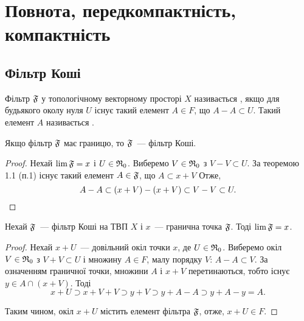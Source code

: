\chapter{Повнота, передкомпактність, компактність}

\section{Фільтр Коші}

\begin{definition}
    Фільтр $\frak F$ у топологічному векторному просторі $X$ називається , якщо для будьякого околу нуля $U$ існує такий елемент $A \in F$, що $A - A \subset U$. Такий елемент $A$ називається .
\end{definition}

\begin{theorem}
    Якщо фільтр $\frak F$ має границю, то $\frak F$~--- фільтр Коші.
\end{theorem}

\begin{proof}
    Нехай $\lim \frak F = x$ і $U \in \frak R_0$. Виберемо $V \in \frak R_0$ з $V - V \subset U$. За теоремою 1.1 (п.1) існує такий елемент $A \in \frak F$, що $A \subset x + V$ Отже,
    \begin{equation*}
        A - A \subset(x + V) -(x + V) \subset V - V \subset U. \qedhere
    \end{equation*}
\end{proof}

\begin{theorem}
    Нехай $\frak F$~--- фільтр Коші на ТВП $X$ і $x$~--- гранична точка $\frak F$. Тоді $\lim \frak F = x$.
\end{theorem}

\begin{proof}
    Нехай $x + U$~--- довільний окіл точки $x$, де $U \in \frak R_0$. Виберемо окіл $V \in \frak R_0$ з $V + V \subset U$ і множину $A \in F$, малу порядку $V$: $A - A \subset V$. За означенням граничної точки, множини $A$ і $x + V$ перетинаються, тобто існує $y \in A \cap(x + V)$. Тоді
    \begin{equation*}
        x + U \supset x + V + V \supset y + V \supset y + A - A \supset y + A - y = A.
    \end{equation*}

    Таким чином, окіл $x + U$ містить елемент фільтра $\frak F$, отже, $x + U \in F$.
\end{proof}


